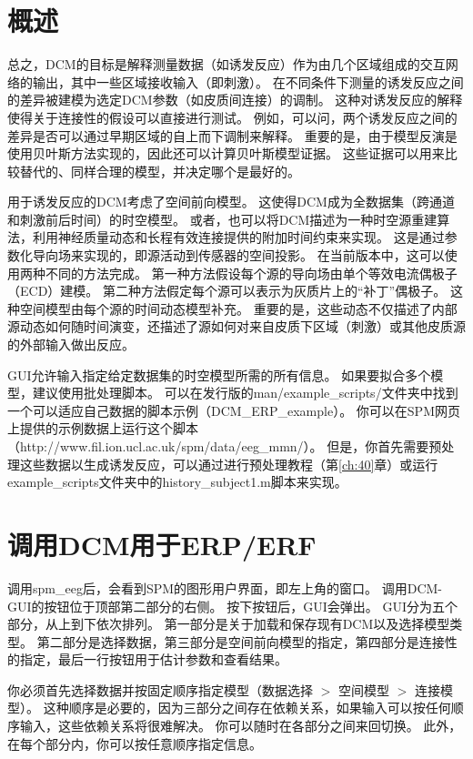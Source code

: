 \section{概述}

总之，DCM的目标是解释测量数据（如诱发反应）作为由几个区域组成的交互网络的输出，其中一些区域接收输入（即刺激）。
在不同条件下测量的诱发反应之间的差异被建模为选定DCM参数（如皮质间连接）的调制\cite{u29}。
这种对诱发反应的解释使得关于连接性的假设可以直接进行测试。
例如，可以问，两个诱发反应之间的差异是否可以通过早期区域的自上而下调制来解释\cite{u56}。
重要的是，由于模型反演是使用贝叶斯方法实现的，因此还可以计算贝叶斯模型证据。
这些证据可以用来比较替代的、同样合理的模型，并决定哪个是最好的\cite{u78}。

用于诱发反应的DCM考虑了空间前向模型。
这使得DCM成为全数据集（跨通道和刺激前后时间）的时空模型。
或者，也可以将DCM描述为一种时空源重建算法，利用神经质量动态和长程有效连接提供的附加时间约束来实现。
这是通过参数化导向场来实现的，即源活动到传感器的空间投影。
在当前版本中，这可以使用两种不同的方法完成。
第一种方法假设每个源的导向场由单个等效电流偶极子（ECD）建模\cite{u76}。
第二种方法假定每个源可以表示为灰质片上的“补丁”偶极子\cite{u28}。
这种空间模型由每个源的时间动态模型补充。
重要的是，这些动态不仅描述了内部源动态如何随时间演变，还描述了源如何对来自皮质下区域（刺激）或其他皮质源的外部输入做出反应。

GUI允许输入指定给定数据集的时空模型所需的所有信息。
如果要拟合多个模型，建议使用批处理脚本。
可以在发行版的man/example\_scripts/文件夹中找到一个可以适应自己数据的脚本示例（DCM\_ERP\_example）。
你可以在SPM网页上提供的示例数据上运行这个脚本（http://www.fil.ion.ucl.ac.uk/spm/data/eeg\_mmn/）。
但是，你首先需要预处理这些数据以生成诱发反应，可以通过进行预处理教程（第\ref{ch:40}章）或运行example\_scripts文件夹中的history\_subject1.m脚本来实现。


\section{调用DCM用于ERP/ERF}

调用spm\_eeg后，会看到SPM的图形用户界面，即左上角的窗口。
调用DCM-GUI的按钮位于顶部第二部分的右侧。
按下按钮后，GUI会弹出。
GUI分为五个部分，从上到下依次排列。
第一部分是关于加载和保存现有DCM以及选择模型类型。
第二部分是选择数据，第三部分是空间前向模型的指定，第四部分是连接性的指定，最后一行按钮用于估计参数和查看结果。

你必须首先选择数据并按固定顺序指定模型（数据选择 $>$ 空间模型 $>$ 连接模型）。
这种顺序是必要的，因为三部分之间存在依赖关系，如果输入可以按任何顺序输入，这些依赖关系将很难解决。
你可以随时在各部分之间来回切换。
此外，在每个部分内，你可以按任意顺序指定信息。


